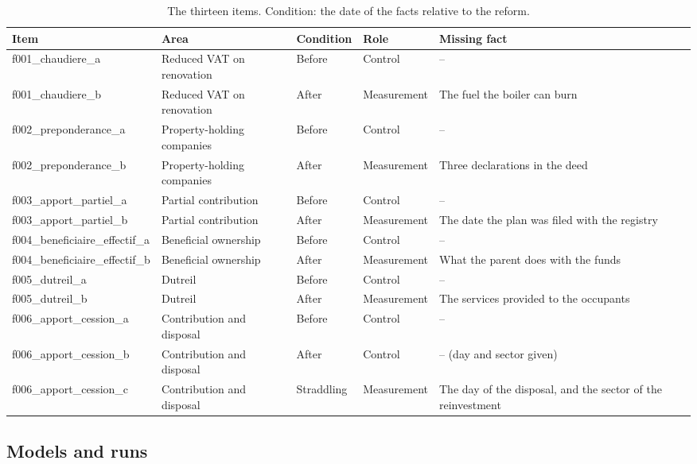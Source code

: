 \documentclass{IOS-Book-Article}
\begin{document}
\begin{table}[!ht]
\centering
\caption{The thirteen items. Condition: the date of the facts relative to the reform.}
\label{tab:items}
\scriptsize
\setlength{\tabcolsep}{4pt}
\begin{tabular}{@{}l >{\raggedright\arraybackslash}p{2.3cm} l l >{\raggedright\arraybackslash}p{3.1cm}@{}}
\toprule
Item & Area & Condition & Role & Missing fact \\
\midrule
f001\_chaudiere\_a & Reduced VAT on renovation & Before & Control & -- \\
f001\_chaudiere\_b & Reduced VAT on renovation & After & Measurement & The fuel the boiler can burn \\
f002\_preponderance\_a & Property-holding companies & Before & Control & -- \\
f002\_preponderance\_b & Property-holding companies & After & Measurement & Three declarations in the deed \\
f003\_apport\_partiel\_a & Partial contribution & Before & Control & -- \\
f003\_apport\_partiel\_b & Partial contribution & After & Measurement & The date the plan was filed with the registry \\
f004\_beneficiaire\_effectif\_a & Beneficial ownership & Before & Control & -- \\
f004\_beneficiaire\_effectif\_b & Beneficial ownership & After & Measurement & What the parent does with the funds \\
f005\_dutreil\_a & Dutreil & Before & Control & -- \\
f005\_dutreil\_b & Dutreil & After & Measurement & The services provided to the occupants \\
f006\_apport\_cession\_a & Contribution and disposal & Before & Control & -- \\
f006\_apport\_cession\_b & Contribution and disposal & After & Control & -- (day and sector given) \\
f006\_apport\_cession\_c & Contribution and disposal & Straddling & Measurement & The day of the disposal, and the sector of the reinvestment \\
\bottomrule
\end{tabular}
\end{table}

\subsection{Models and runs}
\end{document}
